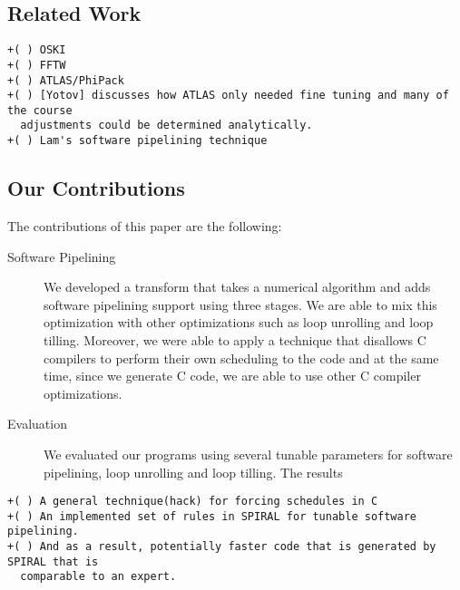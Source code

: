 \documentclass[12pt]{article}
\begin{document}
\subsection{Related Work}
\begin{verbatim}
+( ) OSKI
+( ) FFTW
+( ) ATLAS/PhiPack
+( ) [Yotov] discusses how ATLAS only needed fine tuning and many of the course
  adjustments could be determined analytically.
+( ) Lam's software pipelining technique
\end{verbatim}

\subsection{Our Contributions}

The contributions of this paper are the following:

\begin{description}
   \item[Software Pipelining] We developed a transform that takes a numerical algorithm and adds software pipelining support
   using three stages. We are able to mix this optimization with other optimizations such as loop unrolling and loop tilling.
   Moreover, we were able to apply a technique that disallows C compilers to perform their own scheduling to the code and at
   the same time, since we generate C code, we are able to use other C compiler optimizations. 
   \item[Evaluation] We evaluated our programs using several tunable parameters for software pipelining,
   loop unrolling and loop tilling. The results
\end{description}

\begin{verbatim}
+( ) A general technique(hack) for forcing schedules in C
+( ) An implemented set of rules in SPIRAL for tunable software pipelining.
+( ) And as a result, potentially faster code that is generated by SPIRAL that is
  comparable to an expert.
\end{verbatim}
\end{document}
